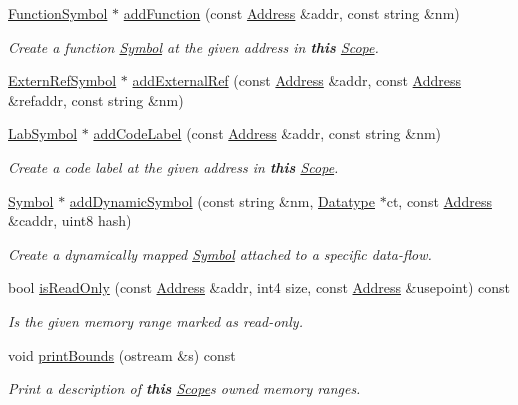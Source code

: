 \begin{DoxyCompactItemize}
\mbox{\hyperlink{class_function_symbol}{Function\+Symbol}} $\ast$ \mbox{\hyperlink{class_scope_a8f7f8bc9f073a957d43298394cac0678}{add\+Function}} (const \mbox{\hyperlink{class_address}{Address}} \&addr, const string \&nm)
\begin{DoxyCompactList}\small\item\em Create a function \mbox{\hyperlink{class_symbol}{Symbol}} at the given address in {\bfseries{this}} \mbox{\hyperlink{class_scope}{Scope}}. \end{DoxyCompactList}\item 
\mbox{\hyperlink{class_extern_ref_symbol}{Extern\+Ref\+Symbol}} $\ast$ \mbox{\hyperlink{class_scope_a648715fd4a06419df21ecdc060ff2911}{add\+External\+Ref}} (const \mbox{\hyperlink{class_address}{Address}} \&addr, const \mbox{\hyperlink{class_address}{Address}} \&refaddr, const string \&nm)
\item 
\mbox{\hyperlink{class_lab_symbol}{Lab\+Symbol}} $\ast$ \mbox{\hyperlink{class_scope_a4dcaf595e4437d91af6a243ef0d49640}{add\+Code\+Label}} (const \mbox{\hyperlink{class_address}{Address}} \&addr, const string \&nm)
\begin{DoxyCompactList}\small\item\em Create a code label at the given address in {\bfseries{this}} \mbox{\hyperlink{class_scope}{Scope}}. \end{DoxyCompactList}\item 
\mbox{\hyperlink{class_symbol}{Symbol}} $\ast$ \mbox{\hyperlink{class_scope_af42668b79a23d2e4e67f54e2185a2b58}{add\+Dynamic\+Symbol}} (const string \&nm, \mbox{\hyperlink{class_datatype}{Datatype}} $\ast$ct, const \mbox{\hyperlink{class_address}{Address}} \&caddr, uint8 hash)
\begin{DoxyCompactList}\small\item\em Create a dynamically mapped \mbox{\hyperlink{class_symbol}{Symbol}} attached to a specific data-\/flow. \end{DoxyCompactList}\item 
bool \mbox{\hyperlink{class_scope_a7b6645d4ce07bea82322ac366b8c6168}{is\+Read\+Only}} (const \mbox{\hyperlink{class_address}{Address}} \&addr, int4 size, const \mbox{\hyperlink{class_address}{Address}} \&usepoint) const
\begin{DoxyCompactList}\small\item\em Is the given memory range marked as {\itshape read-\/only}. \end{DoxyCompactList}\item 
void \mbox{\hyperlink{class_scope_a865f1dd5e0c7dc9a5e65189cc7be2c9b}{print\+Bounds}} (ostream \&s) const
\begin{DoxyCompactList}\small\item\em Print a description of {\bfseries{this}} \mbox{\hyperlink{class_scope}{Scope}}\textquotesingle{}s {\itshape owned} memory ranges. \end{DoxyCompactList}\end{DoxyCompactItemize}
